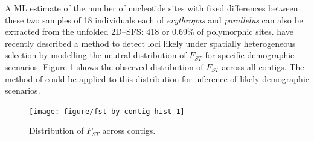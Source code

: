 \documentclass[a4paper,12pt,times,print,index,custombib,custommargin]{PhDThesisPSnPDF}\usepackage[]{graphicx}\usepackage[]{color}
\newenvironment{knitrout}{}{} %
\begin{document}
A ML estimate of the number of nucleotide sites with fixed differences between these two samples of 18 individuals each of \textit{erythropus} and \textit{parallelus} can also be extracted from the unfolded 2D--\gls{SFS}: 418 or 0.69\% of polymorphic sites. \cite{Whitlock2015} have recently described a method to detect loci likely under spatially heterogeneous selection by modelling the neutral distribution of $F_{ST}$ for specific demographic scenarios. Figure \ref{Fig:fst-by-contig-hist} shows the observed distribution of $F_{ST}$ across all contigs. The method of \cite{Whitlock2015} could be applied to this distribution for inference of likely demographic scenarios.

%
\begin{figure}[htb]
\centering
\begin{knitrout}
\color{fgcolor}

{\centering \texttt{[image: figure/fst-by-contig-hist-1]} 

}



\end{knitrout}
\caption{Distribution of $F_{ST}$ across contigs.}
\label{Fig:fst-by-contig-hist}
\end{figure}
%
\clearpage
%
%
\end{document}
